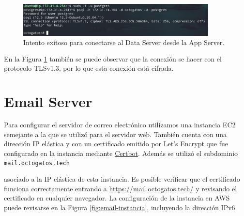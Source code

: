 \documentclass{article}
\newcommand{\ttt}[1]{%
\texttt{#1}%
}
\begin{document}
\begin{figure}[H]
  \centering
  \includegraphics[width=0.9\textwidth]{DATASERVER/exhibitL}
  \caption{Intento exitoso para conectarse al Data Server desde la App Server.}
  \label{fig:DATASERVER-L}
\end{figure}

En la Figura \ref{fig:DATASERVER-L} tambi\'en se
puede observar que la conexi\'on se hacer con el protocolo
TLSv1.3, por lo que esta conexi\'on est\'a cifrada.






\section{Email Server}

Para configurar el servidor de correo electr\'onico
utilizamos una instancia EC2 semejante a la que
se utiliz\'o para el servidor web.   Tambi\'en cuenta
con una direcci\'on IP el\'astica y con un certificado
emitido por \href{https://letsencrypt.org/}{Let's
Encrypt} que fue configurado en la instancia mediante
\href{https://certbot.eff.org/}{Certbot}.   Adem\'as
se utiliz\'o el subdominio \ttt{mail.octogatos.tech}
asociado a la IP el\'astica de esta instancia.   Es
posible verificar que el certificado funciona
correctamente entrando a
\href{https://mail.octogatos.tech/}{https://mail.octogatos.tech/}
y revisando el certificado en cualquier navegador.
La configuraci\'on de la instancia en AWS puede
revisarse en la Figura \ref{fig:email-instancia},
incluyendo la direcci\'on IPv6.
\end{document}
